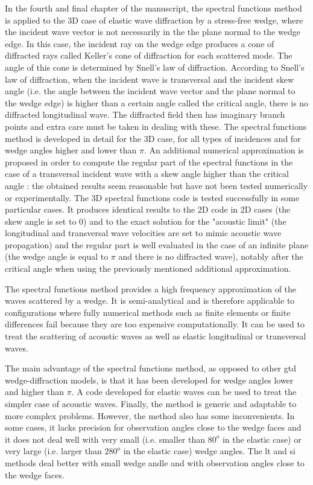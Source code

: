 In the fourth and final chapter of the manuscript, the spectral functions method is applied to the 3D case of elastic wave diffraction by a stress-free wedge, where the incident wave vector is not necessarily in the the plane normal to the wedge edge. In this case, the incident ray on the wedge edge produces a cone of diffracted rays called Keller's cone of diffraction for each scattered mode. The angle of this cone is determined by Snell's law of diffraction. According to Snell's law of diffraction, when the incident wave is transversal and the incident skew angle (i.e. the angle between the incident wave vector and the plane normal to the wedge edge) is higher than a certain angle called the critical angle, there is no diffracted longitudinal wave. The diffracted field then has imaginary branch points and extra care must be taken in dealing with these. The spectral functions method is developed in detail for the 3D case, for all types of incidences and for wedge angles higher and lower than $\pi$. An additional numerical approximation is proposed in order to compute the regular part of the spectral functions in the case of a transversal incident wave with a skew angle higher than the critical angle : the obtained results seem reasonable but have not been tested numerically or experimentally. The 3D spectral functions code is tested successfully in some particular cases. It produces identical results to the 2D code in 2D cases (the skew angle is set to $0$) and to the exact solution for the "acoustic limit" (the longitudinal and transversal wave velocities are set to mimic acoustic wave propagation) and the regular part is well evaluated in the case of an infinite plane (the wedge angle is equal to $\pi$ and there is no diffracted wave), notably after the critical angle when using the previously mentioned additional approximation.

The spectral functions method provides a high frequency approximation of the waves scattered by a wedge. It is semi-analytical and is therefore applicable to configurations where fully numerical methods such as finite elements or finite differences fail because they are too expensive computationally. It can be used to treat the scattering of acoustic waves as well as elastic longitudinal or transversal waves.

The main advantage of the spectral functions method, as opposed to other \acrshort{gtd} wedge-diffraction models, is that it has been developed for wedge angles lower and higher than $\pi$. A code developed for elastic waves can be used to treat the simpler case of acoustic waves. Finally, the method is generic and adaptable to more complex problems. However, the method also has some inconvenients. In some cases, it lacks precision for observation angles close to the wedge faces and it does not deal well with very small (i.e. smaller than $80^o$ in the elastic case) or very large (i.e. larger than $280^o$ in the elastic case) wedge angles. The \acrlong{lt} and \acrlong{si} methods deal better with small wedge andle and with observation angles close to the wedge faces.

